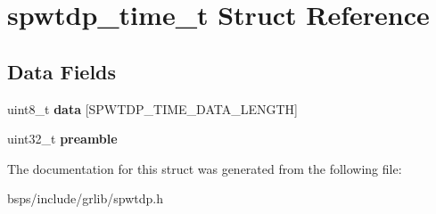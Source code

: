 \hypertarget{structspwtdp__time__t}{}\section{spwtdp\+\_\+time\+\_\+t Struct Reference}
\label{structspwtdp__time__t}
\subsection*{Data Fields}
\begin{DoxyCompactItemize}
\item 
\mbox{\label{structspwtdp__time__t_a852951704c13319e205b3bb1911c6f86}} 
uint8\+\_\+t {\bfseries data} \mbox{[}S\+P\+W\+T\+D\+P\+\_\+\+T\+I\+M\+E\+\_\+\+D\+A\+T\+A\+\_\+\+L\+E\+N\+G\+TH\mbox{]}
\item 
\mbox{\label{structspwtdp__time__t_a4769cd2eaf3333c281b8d54b538b4e94}} 
uint32\+\_\+t {\bfseries preamble}
\end{DoxyCompactItemize}


The documentation for this struct was generated from the following file\+:\begin{DoxyCompactItemize}
\item 
bsps/include/grlib/spwtdp.\+h\end{DoxyCompactItemize}
